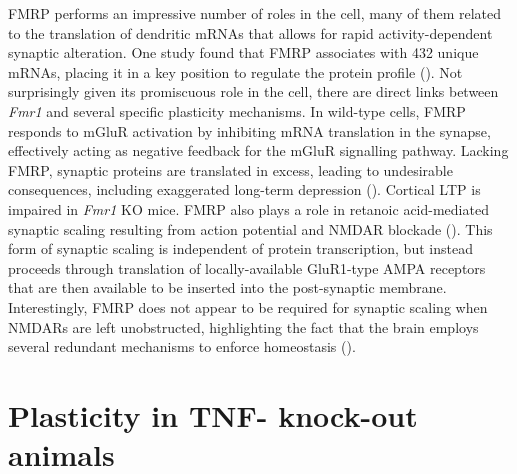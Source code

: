FMRP performs an impressive number of roles in the cell, many of them related to the translation of dendritic mRNAs that allows for rapid activity-dependent synaptic alteration. One study found that FMRP associates with 432 unique mRNAs, placing it in a key position to regulate the protein profile (\cite{Brown2001}). Not surprisingly given its promiscuous role in the cell, there are direct links between \textit{Fmr1} and several specific plasticity mechanisms. In wild-type cells, FMRP responds to mGluR activation by inhibiting mRNA translation in the synapse, effectively acting as negative feedback for the mGluR signalling pathway. Lacking FMRP, synaptic proteins are translated in excess, leading to undesirable consequences, including exaggerated long-term depression (\cite{Huber2002, Bear2004}). Cortical LTP is impaired in \textit{Fmr1} KO mice. FMRP also plays a role in retanoic acid-mediated synaptic scaling resulting from action potential and NMDAR blockade (\cite{Soden2010}). This form of synaptic scaling is independent of protein transcription, but instead proceeds through translation of locally-available GluR1-type AMPA receptors that are then available to be inserted into the post-synaptic membrane. Interestingly, FMRP does not appear to be required for synaptic scaling when NMDARs are left unobstructed, highlighting the fact that the brain employs several redundant mechanisms to enforce homeostasis (\cite{Soden2010}).

\section{Plasticity in TNF-\textalpha{} knock-out animals}

